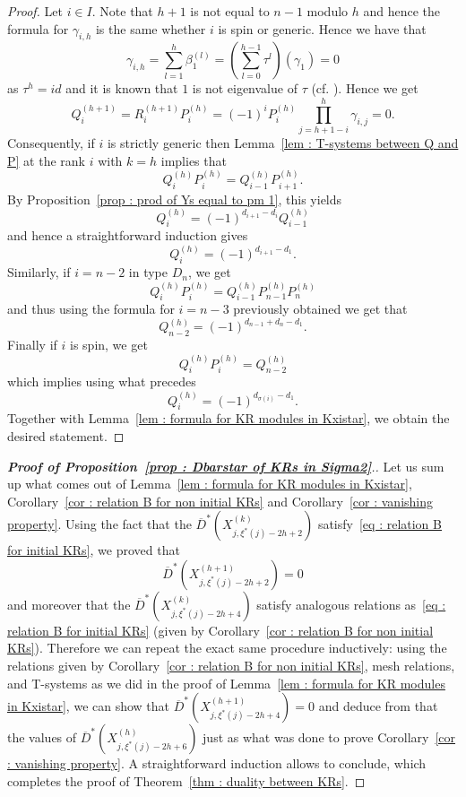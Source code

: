 \documentclass[12pt]{amsart}
\theoremstyle{plain}
\theoremstyle{definition}
\numberwithin{equation}{section}
\newcommand{\barDstar}{\overline{D}^{*}}
\newcommand{\xistar}{\xi^{*}}
\begin{document}
 \begin{proof}
Let $i \in I$. Note that $h+1$ is not equal to $n-1$ modulo $h$ and hence the formula for $\gamma_{i,h}$ is the same whether $i$ is spin or generic. Hence we have that 
$$ \gamma_{i,h} = \sum_{l=1}^{h}  \beta_1^{(l)} = \left( \sum_{l=0}^{h-1} \tau^l \right) (\gamma_1) = 0 $$
as $\tau^h = id$ and it is known that $1$ is not eigenvalue of $\tau$ (cf. \cite[Chapter V, \S6]{BourbakiLieGroupsLieAlgebras4To6}). Hence we get 
$$ Q_i^{(h+1)} = R_i^{(h+1)} P_i^{(h)} = (-1)^{i} P_i^{(h)} \prod_{j=h+1-i}^{h} \gamma_{i,j} = 0 . $$
Consequently, if $i$ is strictly generic then Lemma~\ref{lem : T-systems between Q and P} at the rank $i$ with $k=h$ implies that  
$$ Q_i^{(h)} P_i^{(h)} = Q_{i-1}^{(h)} P_{i+1}^{(h)} .  $$
By Proposition~\ref{prop : prod of Ys equal to pm 1}, this yields
$$ Q_i^{(h)} = (-1)^{d_{i+1}-d_i} Q_{i-1}^{(h)}  $$
and hence a straightforward induction gives 
$$ Q_i^{(h)} = (-1)^{d_{i+1}-d_1}. $$
 Similarly, if $i=n-2$ in type $D_n$, we get 
 $$ Q_i^{(h)}P_i^{(h)} = Q_{i-1}^{(h)}P_{n-1}^{(h)}P_n^{(h)} $$
 and thus using the formula for $i=n-3$ previously obtained we get that 
 $$ Q_{n-2}^{(h)} = (-1)^{d_{n-1}+d_n-d_1} .  $$
 Finally if $i$ is spin, we get 
 $$ Q_i^{(h)} P_i^{(h)} = Q_{n-2}^{(h)}  $$
 which implies using what precedes 
 $$ Q_i^{(h)} = (-1)^{d_{\sigma(i)}-d_1} . $$
Together with Lemma~\ref{lem : formula for KR modules in Kxistar}, we obtain the desired statement. 
 \end{proof}

  \begin{proof}[\textbf{Proof of Proposition~\ref{prop : Dbarstar of KRs in Sigma2}}.]

   Let us sum up what comes out of Lemma~\ref{lem : formula for KR modules in Kxistar}, Corollary~\ref{cor : relation B for non initial KRs} and Corollary~\ref{cor : vanishing property}. Using the fact that the $\barDstar \left( X_{j,\xistar(j)-2h+2}^{(k)} \right)$ satisfy~\eqref{eq : relation B for initial KRs}, we proved that 
   $$ \barDstar \left( X_{j , \xistar(j)-2h+2}^{(h+1)} \right) = 0  $$
   and moreover that the  $\barDstar \left( X_{j , \xistar(j)-2h+4}^{(k)}  \right)$ satisfy analogous relations as~\eqref{eq : relation B for initial KRs} (given by Corollary~\ref{cor : relation B for non initial KRs}). Therefore we can repeat the exact same procedure inductively: using the relations given by Corollary~\ref{cor : relation B for non initial KRs}, mesh relations, and  T-systems  as we did in the proof of Lemma~\ref{lem : formula for KR modules in Kxistar}, we can show that $\barDstar \left( X_{j , \xistar(j)-2h+4}^{(h+1)} \right) = 0$ and deduce from that the values of $\barDstar \left( X_{j , \xistar(j)-2h+6}^{(h)} \right)$ just as what was done to prove Corollary~\ref{cor : vanishing property}. A straightforward induction allows to conclude, which completes the proof of Theorem~\ref{thm : duality between KRs}. 
      
  \end{proof}
 
\end{document}
